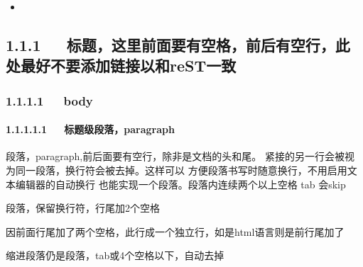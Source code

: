 \documentclass[letterpaper,12pt,english]{sphinxmanual}
\begin{document}
\begin{sphinxShadowBox}
\begin{itemize}
\begin{itemize}
\begin{itemize}
\begin{itemize}
\begin{itemize}
\end{itemize}

\item {} 
\label{\detokenize{001software/001install/001._u7f51_u7ad9/demo-markdown:id12}}{\hyperref[\detokenize{001software/001install/001._u7f51_u7ad9/demo-markdown:id4}]{}}

\end{itemize}

\end{itemize}

\end{itemize}

\end{itemize}
\end{sphinxShadowBox}


\subsection{1.1.1   标题，这里前面要有空格，前后有空行，此处最好不要添加链接以和reST一致}
\label{\detokenize{001software/001install/001._u7f51_u7ad9/demo-markdown:rest}}

\subsubsection{1.1.1.1   body}
\label{\detokenize{001software/001install/001._u7f51_u7ad9/demo-markdown:body}}

\paragraph{1.1.1.1.1   标题级段落，paragraph}
\label{\detokenize{001software/001install/001._u7f51_u7ad9/demo-markdown:paragraph}}
段落，paragraph,前后面要有空行，除非是文档的头和尾。
紧接的另一行会被视为同一段落，换行符会被去掉。这样可以
方便段落书写时随意换行，不用启用文本编辑器的自动换行
也能实现一个段落。段落内连续两个以上空格 tab 会skip

\begin{DUlineblock}{0em}
\item[] 段落，保留换行符，行尾加2个空格
\item[] 因前面行尾加了两个空格，此行成一个独立行，如是html语言则是前行尾加了
\end{DUlineblock}

缩进段落仍是段落，tab或4个空格以下，自动去掉
\end{document}
